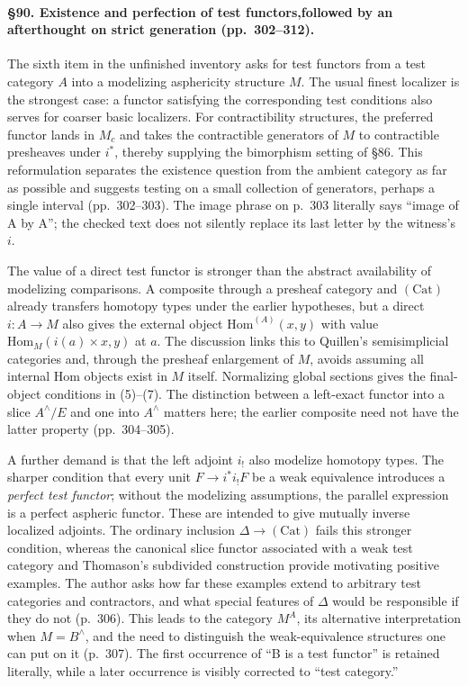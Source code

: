 \paragraph{\S90. Existence and perfection of test functors,\newline followed by an afterthought on strict generation (pp.\ 302--312).}
The sixth item in the unfinished inventory asks for test functors from a test category $A$ into a modelizing asphericity structure $M$. The usual finest localizer is the strongest case: a functor satisfying the corresponding test conditions also serves for coarser basic localizers. For contractibility structures, the preferred functor lands in $M_c$ and takes the contractible generators of $M$ to contractible presheaves under $i^*$, thereby supplying the bimorphism setting of \S86. This reformulation separates the existence question from the ambient category as far as possible and suggests testing on a small collection of generators, perhaps a single interval (pp.\ 302--303). The image phrase on p.\ 303 literally says “image of A by A”; the checked text does not silently replace its last letter by the witness's $i$.

The value of a direct test functor is stronger than the abstract availability of modelizing comparisons. A composite through a presheaf category and $(\mathrm{Cat})$ already transfers homotopy types under the earlier hypotheses, but a direct $i:A\to M$ also gives the external object $\mathrm{Hom}^{(A)}(x,y)$ with value $\mathrm{Hom}_M(i(a)\times x,y)$ at $a$. The discussion links this to Quillen's semisimplicial categories and, through the presheaf enlargement of $M$, avoids assuming all internal Hom objects exist in $M$ itself. Normalizing global sections gives the final-object conditions in (5)--(7). The distinction between a left-exact functor into a slice $A^\wedge/E$ and one into $A^\wedge$ matters here; the earlier composite need not have the latter property (pp.\ 304--305).

A further demand is that the left adjoint $i_!$ also modelize homotopy types. The sharper condition that every unit $F\to i^*i_!F$ be a weak equivalence introduces a \emph{perfect test functor}; without the modelizing assumptions, the parallel expression is a perfect aspheric functor. These are intended to give mutually inverse localized adjoints. The ordinary inclusion $\Delta\to(\mathrm{Cat})$ fails this stronger condition, whereas the canonical slice functor associated with a weak test category and Thomason's subdivided construction provide motivating positive examples. The author asks how far these examples extend to arbitrary test categories and contractors, and what special features of $\Delta$ would be responsible if they do not (p.\ 306). This leads to the category $M^A$, its alternative interpretation when $M=B^\wedge$, and the need to distinguish the weak-equivalence structures one can put on it (p.\ 307). The first occurrence of “B is a test functor” is retained literally, while a later occurrence is visibly corrected to “test category.”

